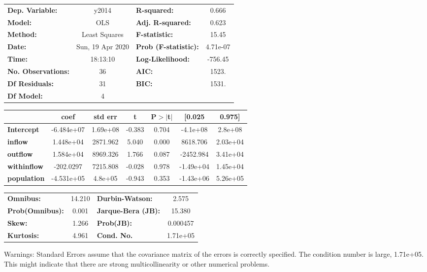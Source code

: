 \begin{center}
\begin{tabular}{lclc}
\toprule
\textbf{Dep. Variable:}    &      y2014       & \textbf{  R-squared:         } &     0.666   \\
\textbf{Model:}            &       OLS        & \textbf{  Adj. R-squared:    } &     0.623   \\
\textbf{Method:}           &  Least Squares   & \textbf{  F-statistic:       } &     15.45   \\
\textbf{Date:}             & Sun, 19 Apr 2020 & \textbf{  Prob (F-statistic):} &  4.71e-07   \\
\textbf{Time:}             &     18:13:10     & \textbf{  Log-Likelihood:    } &   -756.45   \\
\textbf{No. Observations:} &          36      & \textbf{  AIC:               } &     1523.   \\
\textbf{Df Residuals:}     &          31      & \textbf{  BIC:               } &     1531.   \\
\textbf{Df Model:}         &           4      & \textbf{                     } &             \\
\bottomrule
\end{tabular}
\begin{tabular}{lcccccc}
                    & \textbf{coef} & \textbf{std err} & \textbf{t} & \textbf{P$> |$t$|$} & \textbf{[0.025} & \textbf{0.975]}  \\
\midrule
\textbf{Intercept}  &   -6.484e+07  &     1.69e+08     &    -0.383  &         0.704        &     -4.1e+08    &      2.8e+08     \\
\textbf{inflow}     &    1.448e+04  &     2871.962     &     5.040  &         0.000        &     8618.706    &     2.03e+04     \\
\textbf{outflow}    &    1.584e+04  &     8969.326     &     1.766  &         0.087        &    -2452.984    &     3.41e+04     \\
\textbf{withinflow} &    -202.0297  &     7215.808     &    -0.028  &         0.978        &    -1.49e+04    &     1.45e+04     \\
\textbf{population} &   -4.531e+05  &      4.8e+05     &    -0.943  &         0.353        &    -1.43e+06    &     5.26e+05     \\
\bottomrule
\end{tabular}
\begin{tabular}{lclc}
\textbf{Omnibus:}       & 14.210 & \textbf{  Durbin-Watson:     } &    2.575  \\
\textbf{Prob(Omnibus):} &  0.001 & \textbf{  Jarque-Bera (JB):  } &   15.380  \\
\textbf{Skew:}          &  1.266 & \textbf{  Prob(JB):          } & 0.000457  \\
\textbf{Kurtosis:}      &  4.961 & \textbf{  Cond. No.          } & 1.71e+05  \\
\bottomrule
\end{tabular}
\end{center}

Warnings: \newline
 [1] Standard Errors assume that the covariance matrix of the errors is correctly specified. \newline
 [2] The condition number is large, 1.71e+05. This might indicate that there are \newline
 strong multicollinearity or other numerical problems.